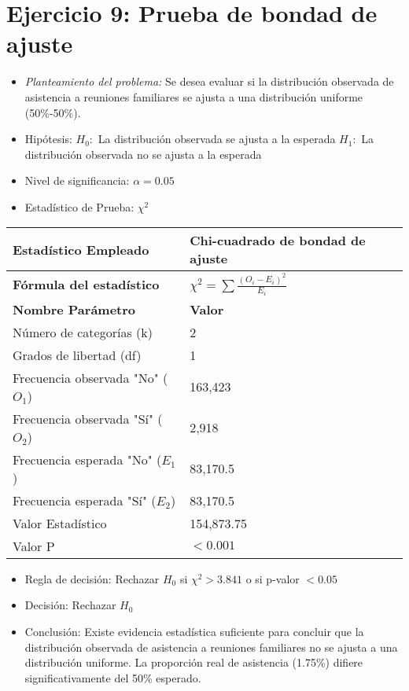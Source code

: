 \documentclass[12pt,a4paper]{article}
\begin{document}
\section*{Ejercicio 9: Prueba de bondad de ajuste}
\begin{itemize}
    \item \textit{Planteamiento del problema:} Se desea evaluar si la distribución observada de asistencia a reuniones familiares se ajusta a una distribución uniforme (50\%-50\%).
    \item Hipótesis: \quad $H_{0}:$ La distribución observada se ajusta a la esperada \hspace{1cm} $H_{1}:$ La distribución observada no se ajusta a la esperada
    \item Nivel de significancia: $\alpha = 0.05$
    \item Estadístico de Prueba: $\chi^2$
\end{itemize}

\begin{tabular}{|m{7cm}|m{7cm}|}
\hline
\textbf{Estadístico Empleado} & Chi-cuadrado de bondad de ajuste \\ \hline
\textbf{Fórmula del estadístico} & $\chi^2 = \sum \frac{(O_i - E_i)^2}{E_i}$ \\ \hline
\textbf{Nombre Parámetro} & \textbf{Valor} \\ \hline
Número de categorías (k) & 2 \\ \hline
Grados de libertad (df) & 1 \\ \hline
Frecuencia observada "No" ($O_1$) & 163,423 \\ \hline
Frecuencia observada "Sí" ($O_2$) & 2,918 \\ \hline
Frecuencia esperada "No" ($E_1$) & 83,170.5 \\ \hline
Frecuencia esperada "Sí" ($E_2$) & 83,170.5 \\ \hline
Valor Estadístico & 154,873.75 \\ \hline
Valor P & $< 0.001$ \\ \hline
\end{tabular}

\begin{itemize}
    \item Regla de decisión: Rechazar $H_0$ si $\chi^2 > 3.841$ o si p-valor $< 0.05$
    \item Decisión: Rechazar $H_0$
    \item Conclusión: Existe evidencia estadística suficiente para concluir que la distribución observada de asistencia a reuniones familiares no se ajusta a una distribución uniforme. La proporción real de asistencia (1.75\%) difiere significativamente del 50\% esperado.
\end{itemize}
\end{document}
